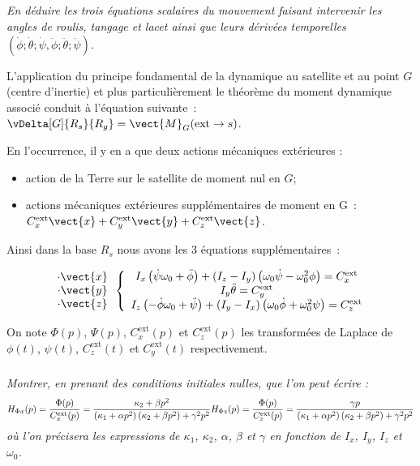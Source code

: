 \subparagraph{\label{q_8}\label{q_05}}\textit{En déduire les trois équations scalaires du mouvement faisant
  intervenir les angles de roulis, tangage et lacet \triplet{\phi}{\theta}{\psi} ainsi que leurs dérivées temporelles $\left(\dot{\phi};\dot{\theta};\dot{\psi},\ddot{\phi};\ddot{\theta};\ddot{\psi}\right)$.}
\ifprof
\begin{corrige}
L'application du principe fondamental de la dynamique au satellite et au
point $G$ (centre d'inertie) et plus particulièrement le théorème du
moment dynamique associé conduit à l'équation suivante~:
$\vDelta[G]{R_s}{R_g}=\vect{M}_G(\text{ext}\to s)$.

 En l'occurrence, il y en a que deux actions mécaniques extérieures :
\begin{itemize}
\item action de la Terre sur le satellite de moment nul en $G$; 
\item actions mécaniques extérieures supplémentaires de moment en G~: $ C_x^{\text{ext}}\vect{x}+C_y^{\text{ext}}\vect{y}+C_z^{\text{ext}}\vect{z}$.
\end{itemize}

Ainsi dans la base $R_s$ nous avons les 3 équations supplémentaires~:

$$
\begin{array}{c}
\cdot \vect{x}\\
\cdot \vect{y}\\
\cdot \vect{z}\\
\end{array}
\left\{
\begin{array}{c}
I_x\left(\dot{\psi}\omega_0+\ddot{\phi} \right)+\left(I_z-I_y\right)\left(\omega_0\dot{\psi}-\omega_0^2\phi\right)=C_x^{\text{ext}}\\
I_y\ddot{\theta}=C_y^{\text{ext}}\\
I_z\left(-\dot{\phi}\omega_0+\ddot{\psi}\right)
+\left(I_y-I_x \right)\left(\omega_0\dot{\phi}+\omega_0^2\psi\right)=C_z^{\text{ext}}\\
\end{array}
\right.
$$

\end{corrige}
\else
\fi


On note $\Phi(p)$, $\Psi(p)$, $C_x^{\text{ext}}(p)$ et $C_z^{\text{ext}}(p)$ les transformées de Laplace de $\phi(t)$, $\psi(t)$, $C_z^{\text{ext}}(t)$ et $C_y^{\text{ext}}(t)$ respectivement. 
%
\subparagraph{\label{q_9}}\textit{Montrer, en prenant des conditions initiales nulles, que l'on peut écrire :}
$$
H_{\Phi x}(p)=\dfrac{\Phi(p)}{C_x^{\text{ext}}(p)}=\dfrac{\kappa_2+\beta p^2}{\left(\kappa_1+\alpha p^2\right)\left(\kappa_2+\beta p^2\right)+\gamma^2p^2}\\
\\
H_{\Phi z}(p)=\dfrac{\Phi(p)}{C_z^{\text{ext}}(p)}=\dfrac{\gamma p}{\left(\kappa_1+\alpha p^2\right)\left(\kappa_2+\beta p^2\right)+\gamma^2p^2}\\
$$
\textit{ où l'on précisera les expressions de $\kappa_1$, $\kappa_2$, $\alpha$, $\beta$ et $\gamma$ en fonction de $I_x$, $I_y$, $I_z$ et $\omega_0$.}

